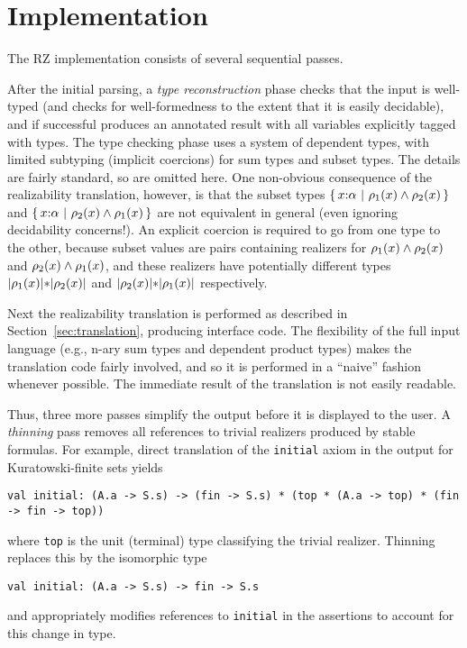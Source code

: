 \section{Implementation}
\label{sec:implementation}

The RZ implementation consists of several sequential passes.  

After the initial parsing, a \emph{type reconstruction} phase checks that the input is well-typed (and checks for well-formedness to the extent that it is easily decidable), and if successful produces an annotated result with all variables explicitly tagged with types.  The type checking phase uses a system of dependent types, with limited subtyping (implicit coercions) for sum types and subset types.  The details are fairly standard, so are omitted here.  One non-obvious consequence of the realizability translation, however, is that the subset types $\{\,x{:}\alpha\ |\ \rho_1(x)\land \rho_2(x)\,\}$ and
$\{\,x{:}\alpha\ |\ \rho_2(x)\land \rho_1(x)\,\}$ are not equivalent in general (even ignoring decidability concerns!).  An explicit coercion is required to go from one type to the other, because subset values are pairs containing realizers for $\rho_1(x)\land \rho_2(x)$ and $\rho_2(x)\land \rho_1(x)$, and these realizers have potentially different types
$|\rho_1(x)|\mathtt{*}|\rho_2(x)|$ and $|\rho_2(x)|\mathtt{*}|\rho_1(x)|$ respectively.

Next the realizability translation is performed as described in Section~\ref{sec:translation}, producing interface code.  The flexibility of the full input language (e.g., n-ary sum types and dependent product types) makes the translation code fairly involved, and so it is performed in a ``naive'' fashion whenever possible.  The immediate result of the translation is not easily readable.
 
Thus, three more passes simplify the output before it is displayed to the user.  A \emph{thinning} pass removes all references to trivial realizers produced by stable formulas.  For example,  direct translation of the \texttt{initial} axiom in the output for Kuratowski-finite sets yields
\begin{Verbatim}
val initial: (A.a -> S.s) -> (fin -> S.s) * (top * (A.a -> top) * (fin -> fin -> top))
\end{Verbatim}
where \texttt{top} is the unit (terminal) type classifying the trivial realizer.  Thinning replaces this by the isomorphic type
\begin{Verbatim}
val initial: (A.a -> S.s) -> fin -> S.s
\end{Verbatim}
and appropriately modifies references to \texttt{initial} in the assertions to account for this change in type.

